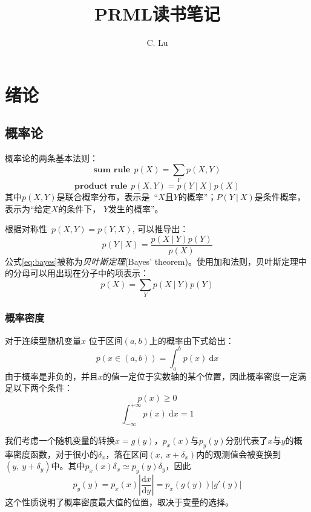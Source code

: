 \documentclass[11pt]{ctexbook}
\title{\textbf{PRML读书笔记} }
\author{C. Lu}
\begin{document}
\maketitle
\tableofcontents

\chapter{绪论}
\section{概率论}
概率论的两条基本法则：
\begin{equation} 
	\mathrm{\textbf{sum rule}} \ \ p(X) = \sum_Y p(X, Y)
\end{equation}
\begin{equation} 
	\mathrm{\textbf{product rule}} \ \ p(X, Y) = p(Y\ |\ X)p(X)
\end{equation}
其中$p(X, Y)$是联合概率分布，表示是\ “$X$且$Y$的概率”；$P(Y\ |\ X)$是条件概率，表示为“给定$X$的条件下， $Y$发生的概率”。

根据对称性\ $p(X, Y) = p(Y, X)$, 可以推导出：
\begin{equation}
	\label{eq:bayes}
	p(Y\ |\ X) = \frac{p(X\ |\ Y)p(Y)}{p(X)}
\end{equation}
公式\ref{eq:bayes}被称为\emph{贝叶斯定理}(Bayes' theorem)。使用加和法则，贝叶斯定理中的分母可以用出现在分子中的项表示：
\begin{equation}
	p(X) = \sum_Y p(X\ |\ Y)p(Y)
\end{equation}
\subsection{概率密度}
对于连续型随机变量$x$ 位于区间$ (a, b)$上的概率由下式给出：
\begin{equation}
	p(x\in(a, b)) = \int_{a}^{b}p(x)\ \mathrm{d}x
\end{equation}
由于概率是非负的，并且$x$的值一定位于实数轴的某个位置，因此概率密度一定满足以下两个条件：
\begin{equation}
	p(x) \geqslant 0
\end{equation}
\begin{equation}
	\int_{-\infty}^{+\infty}p(x)\ \mathrm{d}x= 1
\end{equation}

我们考虑一个随机变量的转换$x = g(y)$，$p_x(x)$与$p_y(y)$分别代表了$x$与$y$的概率密度函数，对于很小的$\delta_x$，落在区间$(x,\ x+\delta_x)$内的观测值会被变换到$(y,\ y+\delta_y)$中。其中$p_x(x)\delta_x \simeq p_y(y)\delta_y$，因此
\begin{equation}
	p_y(y) = p_x(x)\left|\frac{\mathrm{d}x}{\mathrm{d}y}\right| = p_x(g(y))\left|g'(y)\right|
\end{equation}
这个性质说明了概率密度最大值的位置，取决于变量的选择。
\end{document}
